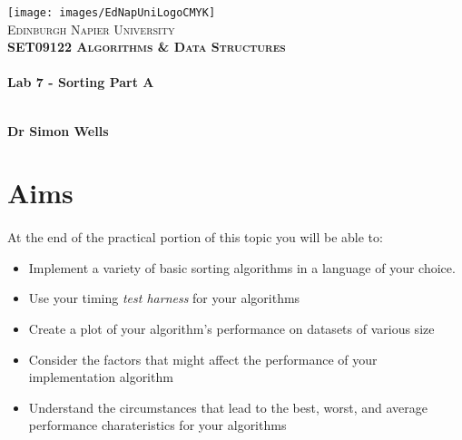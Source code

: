 \documentclass[10pt, a4paper, twosize]{article}
\begin{document}

\begin{titlepage}
\vspace*{5cm}
\begin{center}
\texttt{[image: images/EdNapUniLogoCMYK]}~\\[1cm]

\textsc{\Large Edinburgh Napier University}\\[1.5cm]

\textsc{\LARGE \bfseries SET09122 Algorithms \& Data Structures}\\[0.5cm]

\hrulefill \\[0.4cm]
{\huge \bfseries Lab 7 - Sorting Part A \\[0.4cm] }
\hrulefill \\[1.5cm]

\begin{minipage}{0.4\textwidth}
\begin{flushleft} \large
\textbf{Dr Simon Wells} \\
\end{flushleft}
\end{minipage}

\vfill

\end{center}
\end{titlepage}




%

\section{Aims}
\paragraph{} At the end of the practical portion of this topic you will be able to:

\begin{itemize}
\item Implement a variety of basic sorting algorithms in a language of your choice.
\item Use your timing \emph{test harness} for your algorithms
\item Create a plot of your algorithm's performance on datasets of various size
\item Consider the factors that might affect the performance of your implementation algorithm
\item Understand the circumstances that lead to the best, worst, and average performance charateristics for your algorithms
\end{itemize}
\end{document}
